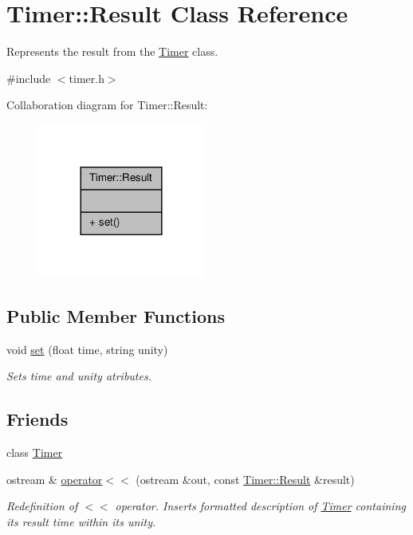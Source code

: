 \hypertarget{classTimer_1_1Result}{\section{Timer\-:\-:Result Class Reference}
\label{classTimer_1_1Result}
}


Represents the result from the \hyperlink{classTimer}{Timer} class.  




{\ttfamily \#include $<$timer.\-h$>$}



Collaboration diagram for Timer\-:\-:Result\-:\nopagebreak
\begin{figure}[H]
\begin{center}
\leavevmode
\includegraphics[width=156pt]{classTimer_1_1Result__coll__graph}
\end{center}
\end{figure}
\subsection*{Public Member Functions}
\begin{DoxyCompactItemize}
\item 
void \hyperlink{classTimer_1_1Result_ab885b8f6a35e1e5e1cecf5895e7453a5}{set} (float time, string unity)
\begin{DoxyCompactList}\small\item\em Sets time and unity atributes. \end{DoxyCompactList}\end{DoxyCompactItemize}
\subsection*{Friends}
\begin{DoxyCompactItemize}
\item 
class \hyperlink{classTimer_1_1Result_a50de43af5bed41f30c071d8cce0e81bc}{Timer}
\item 
ostream \& \hyperlink{classTimer_1_1Result_a00905e20b7819b1293e4efefab7da28e}{operator$<$$<$} (ostream \&out, const \hyperlink{classTimer_1_1Result}{Timer\-::\-Result} \&result)
\begin{DoxyCompactList}\small\item\em Redefinition of $<$$<$ operator. Inserts formatted description of \hyperlink{classTimer}{Timer} containing its result time within its unity. \end{DoxyCompactList}\end{DoxyCompactItemize}


